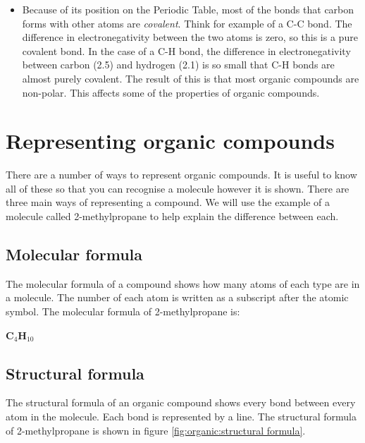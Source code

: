\begin{itemize}
\item{Because of its position on the Periodic Table, most of the bonds that carbon forms with other atoms are \textit{covalent}. Think for example of a C-C bond. The difference in electronegativity between the two atoms is zero, so this is a pure covalent bond. In the case of a C-H bond, the difference in electronegativity between carbon (2.5) and hydrogen (2.1) is so small that C-H bonds are almost purely covalent. The result of this is that most organic compounds are non-polar. This affects some of the properties of organic compounds.}

\end{itemize}







\section{Representing organic compounds}
\label{sec:organic:representing}

There are a number of ways to represent organic compounds. It is useful to know all of these so that you can recognise a molecule however it is shown. There are three main ways of representing a compound. We will use the example of a molecule called 2-methylpropane to help explain the difference between each.

\subsection{Molecular formula}

The molecular formula of a compound shows how many atoms of each type are in a molecule. The number of each atom is written as a subscript after the atomic symbol. The molecular formula of 2-methylpropane is:

\begin{center}
\textbf{C$_{4}$H$_{10}$}
\end{center}


\subsection{Structural formula}

The structural formula of an organic compound shows every bond between every atom in the molecule. Each bond is represented by a line. The structural formula of 2-methylpropane is shown in figure \ref{fig:organic:structural formula}.


